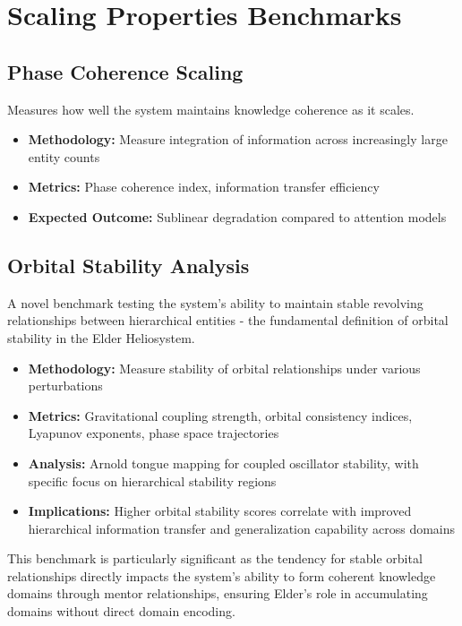 \section{Scaling Properties Benchmarks}

\subsection{Phase Coherence Scaling}

Measures how well the system maintains knowledge coherence as it scales.

\begin{itemize}
    \item \textbf{Methodology:} Measure integration of information across increasingly large entity counts
    \item \textbf{Metrics:} Phase coherence index, information transfer efficiency
    \item \textbf{Expected Outcome:} Sublinear degradation compared to attention models
\end{itemize}

\subsection{Orbital Stability Analysis}

A novel benchmark testing the system's ability to maintain stable revolving relationships between hierarchical entities - the fundamental definition of orbital stability in the Elder Heliosystem.

\begin{itemize}
    \item \textbf{Methodology:} Measure stability of orbital relationships under various perturbations
    \item \textbf{Metrics:} Gravitational coupling strength, orbital consistency indices, Lyapunov exponents, phase space trajectories 
    \item \textbf{Analysis:} Arnold tongue mapping for coupled oscillator stability, with specific focus on hierarchical stability regions
    \item \textbf{Implications:} Higher orbital stability scores correlate with improved hierarchical information transfer and generalization capability across domains
\end{itemize}

This benchmark is particularly significant as the tendency for stable orbital relationships directly impacts the system's ability to form coherent knowledge domains through mentor relationships, ensuring Elder's role in accumulating domains without direct domain encoding.

